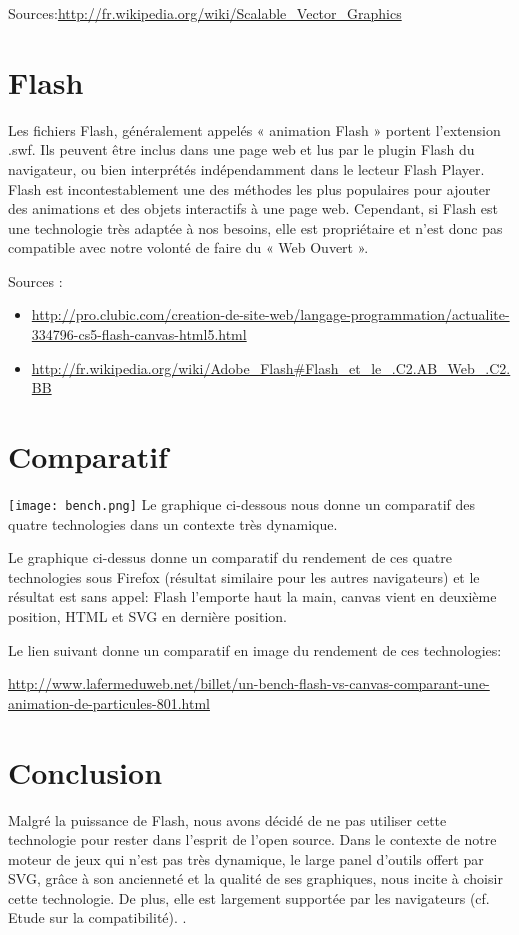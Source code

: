 \documentclass[a4paper,10pt]{report}
\begin{document}
Sources:\url{http://fr.wikipedia.org/wiki/Scalable_Vector_Graphics}

\section{Flash}
Les fichiers Flash, généralement appelés « animation Flash » portent l'extension .swf. 
Ils peuvent être inclus dans une page web et lus par le plugin Flash du navigateur, ou 
bien interprétés indépendamment dans le lecteur Flash Player. Flash est incontestablement 
une des méthodes les plus populaires pour ajouter des animations et des objets
 interactifs à une page web. 
Cependant, si Flash est une technologie très adaptée à nos besoins, elle est propriétaire
 et n'est donc pas compatible avec notre volonté de faire du « Web Ouvert ».
 
Sources : 
\begin{itemize}
\item  \url{http://pro.clubic.com/creation-de-site-web/langage-programmation/actualite-334796-cs5-flash-canvas-html5.html}
\item \url{http://fr.wikipedia.org/wiki/Adobe_Flash#Flash_et_le_.C2.AB_Web_.C2.BB}
\end{itemize}

\section{Comparatif}
\texttt{[image: bench.png]}
Le graphique ci-dessous nous donne un comparatif des quatre technologies dans 
un contexte très dynamique.
 
Le graphique ci-dessus donne un comparatif du rendement de ces quatre technologies sous 
Firefox (résultat similaire pour les autres navigateurs) et le résultat est sans appel: 
Flash l'emporte haut la main, canvas vient en deuxième position, HTML et SVG en dernière 
position.

  

Le lien suivant donne un comparatif en image du rendement de ces technologies:
 
\url{http://www.lafermeduweb.net/billet/un-bench-flash-vs-canvas-comparant-une-animation-de-particules-801.html}

\section{Conclusion}
Malgré la puissance de Flash, nous avons décidé de ne pas utiliser cette 
technologie pour rester dans l'esprit de l'open source.
Dans le contexte de notre moteur de jeux qui n'est pas très dynamique, le large panel 
d'outils offert par SVG, grâce à son ancienneté et la qualité de ses graphiques,
 nous incite à choisir cette technologie. De plus, elle est largement supportée par les navigateurs
 (cf. Etude sur la compatibilité). .
\end{document}
